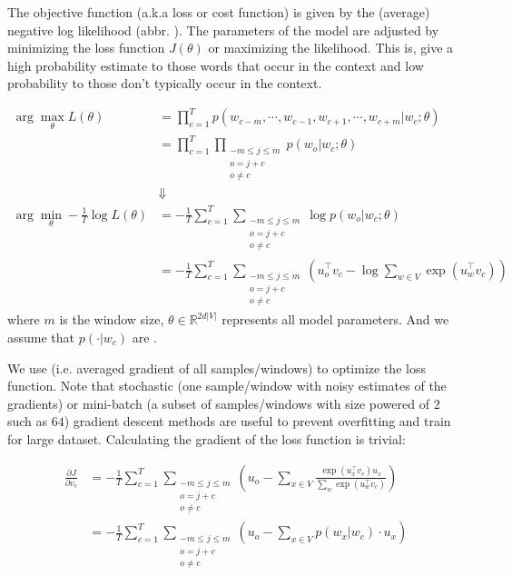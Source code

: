 \MoveNextFigure{+5cm}


The objective function (a.k.a loss or cost function) is given by the (average) negative log likelihood (abbr. ).
The parameters of the model are adjusted by minimizing the loss function $J(\theta)$ or maximizing the likelihood.
This is, give a high probability estimate to those words that occur in the context and low probability to those don't typically occur in the context.


\begin{align}
	\arg\max_\theta L(\theta) &= \prod_{c=1}^{T} p(w_{c-m}, \cdots, w_{c-1}, w_{c+1}, \cdots, w_{c+m} | w_c; \theta) \nonumber \\
	&= \prod_{c=1}^{T} \prod_{\substack{-m \le j \le m \\ o = j + c \\ o \ne c}} p(w_o | w_c; \theta) \nonumber \\
	&\Downarrow \nonumber \\
	\arg\min_\theta -\frac{1}{T} \log L(\theta) &= -\frac{1}{T} \sum_{c=1}^{T} \sum_{ \substack{-m \le j \le m \\ o=j+c \\ o \ne c}} \log p(w_o | w_c; \theta) \nonumber \\
	&= -\frac{1}{T} \sum_{c=1}^{T} \sum_{ \substack{-m \le j \le m \\ o=j+c \\ o \ne c}} \left( u_o^\top v_c - \log \sum_{w \in V} \exp(u_w^\top v_c)\right) 
	\label{eq:word2vec_loss}
\end{align}
where $m$ is the window size, $\theta \in \mathbb{R}^{2d|V|}$ represents all model parameters.
And we assume that $p(\cdot | w_c)$ are .


We use  (i.e. averaged gradient of all samples/windows) to optimize the loss function.
Note that stochastic (one sample/window with noisy estimates of the gradients) or mini-batch (a subset of samples/windows with size powered of $2$ such as $64$) gradient descent methods are useful to prevent overfitting and train for large dataset.
Calculating the gradient of the loss function is trivial:

\begin{equation}
\begin{split}
\frac{\partial J}{\partial v_c} &= -\frac{1}{T} \sum_{c=1}^{T} \sum_{ \substack{-m \le j \le m \\ o=j+c \\ o \ne c}} \left(u_o - \sum_{x \in V} \frac{\exp(u_x^\top v_c) u_x}{\sum_w \exp(u_w^\top v_c)}\right) \\
&= -\frac{1}{T} \sum_{c=1}^{T} \sum_{ \substack{-m \le j \le m \\ o=j+c \\ o \ne c}} \left(u_o - \sum_{x \in V} p(w_x | w_c) \cdot u_x \right)
\end{split}
\end{equation}

